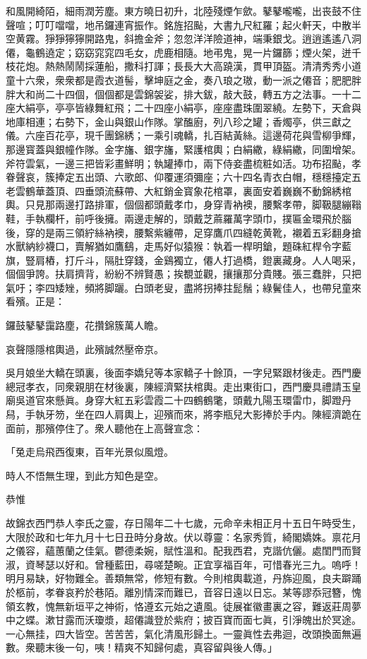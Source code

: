 和風開綺陌，細雨潤芳塵。東方曉日初升，北陸殘煙乍歛。鼕鼕嚨嚨，出丧鼓不住聲喧；叮叮噹噹，地吊鑼連宵振作。銘旌招颭，大書九尺紅羅；起火軒天，中散半空黄霧。猙猙獰獰開路鬼，斜擔金斧；忽忽洋洋險道神，端秉銀戈。逍逍遙遙八洞僊，龜鶴遶定；窈窈窕窕四毛女，虎鹿相隨。地弔鬼，晃一片鑼篩；煙火架，迸千枝花炮。熱熱鬧鬧採蓮船，撒科打諢；長長大大高蹺漢，貫甲頂盔。清清秀秀小道童十六衆，衆衆都是霞衣道髻，擊坤庭之金，奏八琅之璈，動一派之僊音；肥肥胖胖大和尚二十四個，個個都是雲錦袈娑，排大鈸，敲大鼓，轉五方之法事。一十二座大絹亭，亭亭皆綠舞紅飛；二十四座小絹亭，座座盡珠圍翠繞。左勢下，天倉與地庫相連；右勢下，金山與銀山作隊。掌醢廚，列八珍之罐；香燭亭，供三獻之儀。六座百花亭，現千團錦綉；一乘引魂轎，扎百結黃絲。這邊荷花與雪柳爭輝，那邊寳蓋與銀幢作隊。金字旛、銀字旛，緊護棺輿；白絹繖，綠絹繖，同圍增架。斧符雲氣，一邊三把皆彩畫鮮明；執罐捧巾，兩下侍妾盡梳粧如活。功布招颭，孝眷聲哀，簇捧定五出頭、六歌郎、仰覆運須彌座；六十四名青衣白帽，穩穩擡定五老雲鶴華蓋頂、四垂頭流蘇帶、大紅銷金寳象花棺罩，裏面安着巍巍不動錦綉棺輿。只見那兩邊打路排軍，個個都頭戴孝巾，身穿青衲襖，腰繫孝帶，脚靸腿繃䩺鞋，手執欄杆，前呼後擁。兩邊走解的，頭戴芝蔴羅萬字頭巾，撲匾金環飛於腦後，穿的是兩三領紵絲衲襖，腰繫紫纏帶，足穿鷹爪四縫乾黄靴，襯着五彩翻身搶水獸納紗襪口，賣解猶如鷹鷂，走馬好似猿猴：執着一桿明鎗，題硃紅桿令字藍旗，豎肩樁，打斤斗，隔肚穿錢，金鷄獨立，僊人打過橋，鐙裏藏身。人人喝采，個個爭誇。扶肩擠背，紛紛不辨賢愚；挨覩並觀，攘攘那分貴賤。張三蠢胖，只把氣吁；李四矮矬，頻將脚躧。白頭老叟，盡將拐捧拄髭鬚；綠鬢佳人，也帶兒童來看殯。正是：

鑼鼓鼕鼕靄路塵，花攢錦簇萬人瞻。

哀聲隱隱棺輿過，此殯誠然壓帝京。

吳月娘坐大轎在頭裏，後面李嬌兒等本家轎子十餘頂，一字兒緊跟材後走。西門慶總冠孝衣，同衆親朋在材後裏，陳經濟緊扶棺輿。走出東街口，西門慶具禮請玉皇廟吳道官來懸眞。身穿大紅五彩雲霞二十四鶴鶴氅，頭戴九陽玉環雷巾，脚蹬丹舄，手執牙笏，坐在四人肩輿上，迎殯而來，將李瓶兒大影捧於手内。陳經濟跪在面前，那殯停住了。衆人聽他在上高聲宣念：

「兔走烏飛西復東，百年光景似風燈。

時人不悟無生理，到此方知色是空。

恭惟

故錦衣西門恭人李氏之靈，存日陽年二十七歲，元命辛未相正月十五日午時受生，大限於政和七年九月十七日丑時分身故。伏以尊靈：名家秀質，綺閣嬌姝。禀花月之儀容，蘊蕙蘭之佳氣。鬱德柔婉，賦性溫和。配我西君，克諧伉儷。處閨門而賢淑，資琴瑟以好和。曾種藍田，尋嗟楚畹。正宜享福百年，可惜春光三九。嗚呼！明月易缺，好物難全。善類無常，修短有數。今則棺輿載道，丹旆迎風，良夫躃踊於柩前，孝眷哀矜於巷陌。離別情深而難已，音容日遠以日忘。某等謬忝冠簪，愧領玄教，愧無新垣平之神術，恪遵玄元始之遺風。徒展崔徽畫裏之容，難返莊周夢中之蝶。漱甘露而沃瓊漿，超僊識登於紫府；披百寶而面七眞，引淨魄出於冥途。一心無挂，四大皆空。苦苦苦，氣化清風形歸土。一靈眞性去弗迴，改頭換面無遍數。衆聽末後一句，咦！精爽不知歸何處，真容留與後人傳。」

